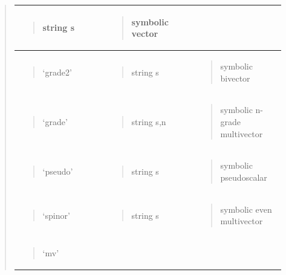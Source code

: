 \documentclass[letterpaper,10pt,english]{sphinxmanual}
\begin{document}
\begin{fulllineitems}
\begin{quote}
\begin{tabular}{|p{0.317\linewidth}|p{0.317\linewidth}|p{0.317\linewidth}|}
\begin{quote}
string s
\end{quote}
 & \begin{quote}

symbolic vector
\end{quote}
\\\hline
\begin{quote}

`grade2'
\end{quote}
 & \begin{quote}

string s
\end{quote}
 & \begin{quote}

symbolic bivector
\end{quote}
\\\hline
\begin{quote}

`grade'
\end{quote}
 & \begin{quote}

string s,n
\end{quote}
 & \begin{quote}

symbolic n-grade multivector
\end{quote}
\\\hline
\begin{quote}

`pseudo'
\end{quote}
 & \begin{quote}

string s
\end{quote}
 & \begin{quote}

symbolic pseudoscalar
\end{quote}
\\\hline
\begin{quote}

`spinor'
\end{quote}
 & \begin{quote}

string s
\end{quote}
 & \begin{quote}

symbolic even multivector
\end{quote}
\\\hline
\begin{quote}

`mv'
\end{quote}
 & \begin{quote}


\end{quote}
\end{tabular}
\end{quote}
\end{fulllineitems}
\end{document}
